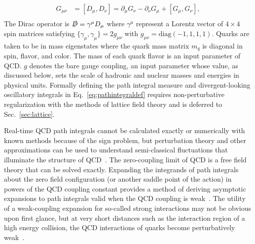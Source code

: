 \begin{equation}
  \begin{split}
    G_{\mu\nu} &= [D_\mu, D_\nu] = \partial_\mu G_\nu - \partial_\nu G_\mu + [G_\mu, G_\nu],\\
\end{split}
  \label{eq:fieldstrengthdef}
\end{equation}
The Dirac operator is $\slashed{D} = \gamma^\mu D_\mu$ where $\gamma^\mu$ represent a Lorentz vector of $4\times 4$ spin matrices satisfying $\{\gamma_\mu,\gamma_\mu\} = 2g_{\mu\nu}$ with $g_{\mu\nu} = \text{diag}(-1,1,1,1)$. 
Quarks are taken to be in mass eigenstates where the quark mass matrix $m_q$ is diagonal in spin, flavor, and color. 
The mass of each quark flavor is an input parameter of QCD. 
$g$ denotes the bare gauge coupling, an input parameter whose value, as discussed below, sets the scale of hadronic and nuclear masses and energies in physical units.
Formally defining the path integral measure and divergent-looking oscillatory integrals in Eq.~\eqref{eq:pathintegraldef} requires non-perturbative regularization with the methods of lattice field theory and is deferred to Sec.~\ref{sec:lattice}.

Real-time QCD path integrals cannot be calculated exactly or numerically with known methods because of the sign problem,  
but perturbation theory and other approximations can be used to understand semi-classical fluctuations that illuminate the structure of QCD~\cite{Hooft:1972fi}.
The zero-coupling limit of QCD is a free field theory that can be solved exactly.
Expanding the integrands of path integrals about the zero field configuration (or another saddle point of the action) in powers of the QCD coupling constant provides a method of deriving asymptotic expansions to path integrals valid when the QCD coupling is weak~\cite{tHooft:1977xjm}.
The utility of a weak-coupling expansion for so-called strong interactions may not be obvious upon first glance, but
at very short distances such as the interaction region of a high energy collision, the QCD interactions of quarks become perturbatively weak~\cite{Politzer:1973fx,Gross:1973id}.

